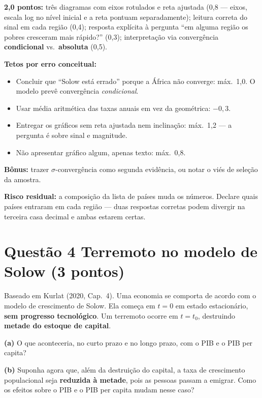 \documentclass[11pt, a4paper]{article}
\begin{document}
\begin{tcolorbox}[rubricbox]
\small
\textbf{2,0 pontos:} três diagramas com eixos rotulados e reta ajustada (0,8 --- eixos,
escala log no nível inicial e a reta pontuam separadamente); leitura correta do sinal em
cada região (0,4); resposta explícita à pergunta ``em alguma região os pobres cresceram
mais rápido?'' (0,3); interpretação via convergência \textbf{condicional} vs.\
\textbf{absoluta} (0,5).

\smallskip
\textbf{Tetos por erro conceitual:}
\begin{itemize}[topsep=2pt]
\item Concluir que ``Solow está errado'' porque a África não converge: máx.\ 1,0. O modelo
      prevê convergência \emph{condicional}.
\item Usar média aritmética das taxas anuais em vez da geométrica: $-0{,}3$.
\item Entregar os gráficos sem reta ajustada nem inclinação: máx.\ 1,2 --- a pergunta é
      sobre sinal e magnitude.
\item Não apresentar gráfico algum, apenas texto: máx.\ 0,8.
\end{itemize}
\textbf{Bônus:} trazer $\sigma$-convergência como segunda evidência, ou notar o viés de
seleção da amostra.

\smallskip
\textbf{Risco residual:} a composição da lista de países muda os números. Declare quais
países entraram em cada região --- duas respostas corretas podem divergir na terceira casa
decimal e ambas estarem certas.
\end{tcolorbox}

\section[Questão 4 --- Terremoto no modelo de Solow]{Questão 4 \quad Terremoto no modelo de Solow \hfill \normalsize (3 pontos)}

\begin{tcolorbox}[questionbox]
\small
Baseado em Kurlat (2020, Cap.\ 4). Uma economia se comporta de acordo com o modelo de
crescimento de Solow. Ela começa em $t=0$ em estado estacionário, \textbf{sem progresso
tecnológico}. Um terremoto ocorre em $t = t_0$, destruindo \textbf{metade do estoque de
capital}.

\textbf{(a)} O que aconteceria, no curto prazo e no longo prazo, com o PIB e o PIB per
capita?

\textbf{(b)} Suponha agora que, além da destruição do capital, a taxa de crescimento
populacional seja \textbf{reduzida à metade}, pois as pessoas passam a emigrar. Como os
efeitos sobre o PIB e o PIB per capita mudam nesse caso?
\end{tcolorbox}
\end{document}
